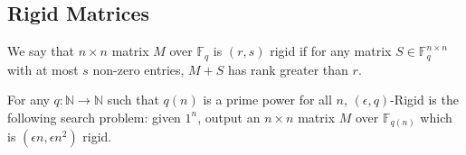 \subsection{Rigid Matrices}
\begin{definition}\cite{Valiant}
We say that $n \times n$ matrix $M$ over $\mathbb{F}_q$ is $(r, s)$ rigid if for any matrix $S \in \mathbb{F}_q^{n \times n}$ with at most $s$ non-zero entries, $M+S$ has rank greater than $r$.
\end{definition}

\begin{definition}
For any $q: \mathbb{N} \rightarrow \mathbb{N}$ such that $q(n)$ is a prime power for all $n$, {\sc $(\epsilon, q)$-Rigid} is the following search problem: given $1^n$, output an $n \times n$ matrix $M$ over $\mathbb{F}_{q(n)}$ which is $(\epsilon n, \epsilon n^2)$ rigid.
\end{definition}

